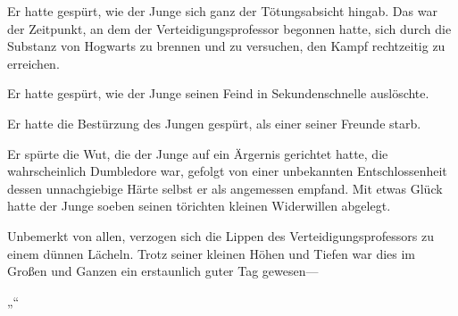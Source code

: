 Er hatte gespürt, wie der Junge sich ganz der Tötungsabsicht hingab. Das war der Zeitpunkt, an dem der Verteidigungsprofessor begonnen hatte, sich durch die Substanz von Hogwarts zu brennen und zu versuchen, den Kampf rechtzeitig zu erreichen.

Er hatte gespürt, wie der Junge seinen Feind in Sekundenschnelle auslöschte.

Er hatte die Bestürzung des Jungen gespürt, als einer seiner Freunde starb.

Er spürte die Wut, die der Junge auf ein Ärgernis gerichtet hatte, die wahrscheinlich Dumbledore war, gefolgt von einer unbekannten Entschlossenheit dessen unnachgiebige Härte selbst er als angemessen empfand. Mit etwas Glück hatte der Junge soeben seinen törichten kleinen Widerwillen abgelegt.

Unbemerkt von allen, verzogen sich die Lippen des Verteidigungsprofessors zu einem dünnen Lächeln.
Trotz seiner kleinen Höhen und Tiefen war dies im Großen und Ganzen ein erstaunlich guter Tag gewesen—

„“

